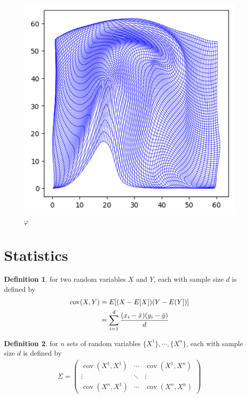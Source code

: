\documentclass[a4paper]{article}
\theoremstyle{definition}
\newtheorem{definition}{Definition}
\theoremstyle{plain}
\begin{document}
\begin{figure}[H]
\centering
\includegraphics[scale=0.6]{figure/diffeo.png}
\caption{$\varphi$}
\end{figure}

\newpage
\section{Statistics}
\begin{definition}
 for two random variables $X$ and $Y$, each with sample size $d$ is defined by
\begin{align*}
    \operatorname{cov}(X,Y)&=E[(X-E[X])(Y-E(Y])]\\
    &=\sum^d_{i=1}\frac{(x_i-\Bar{x})(y_i-\Bar{y})}{d}
\end{align*}
\end{definition}

\begin{definition}
 for $n$ sets of random variables $\{X^1\},\cdots,\{X^n\}$, each with sample size $d$ is defined by
\begin{align*}
    \Sigma=
    \begin{pmatrix}
        \operatorname{cov}(X^1,X^1) & \cdots & \operatorname{cov}(X^1,X^n)\\
        \vdots &  \ddots &  \vdots \\
        \operatorname{cov}(X^n,X^1) & \cdots & \operatorname{cov}(X^n,X^n)
    \end{pmatrix}
\end{align*}
\end{definition}
\end{document}

